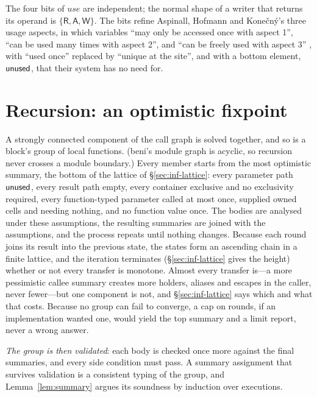 The four bits of $\mathit{use}$ are independent; the normal shape of a writer that returns its operand
is $\{\mathsf{R}, \mathsf{A}, \mathsf{W}\}$. The bits refine Aspinall, Hofmann and Kone\v{c}n\'y's three
usage aspects, in which variables ``may only be accessed once with aspect 1'', ``can be used many times
with aspect 2'', and ``can be freely used with aspect 3'' \citep[\S1]{aspinall2008usage}, with ``used
once'' replaced by ``unique at the site'', and with a bottom element, $\mathsf{unused}$, that their system has
no need for.

\section{Recursion: an optimistic fixpoint}
\label{sec:inf-recursion}

A strongly connected component of the call graph is solved together, and so is a block's group of local
functions. (beni's module graph is acyclic, so recursion never crosses a module boundary.) Every member
starts from the most optimistic summary, the bottom of the lattice of \S\ref{sec:inf-lattice}: every
parameter path $\mathsf{unused}$, every result path empty, every container exclusive and no exclusivity
required, every function-typed parameter called at most once, supplied owned cells and needing nothing,
and no function value once. The bodies are analysed under these assumptions, the resulting summaries
are joined with the assumptions, and the process repeats until nothing changes. Because each round joins
its result into the previous state, the states form an ascending chain in a finite lattice, and the
iteration terminates (\S\ref{sec:inf-lattice} gives the height) whether or not every transfer is
monotone. Almost every transfer is---a more pessimistic callee summary creates more holders, aliases and
escapes in the caller, never fewer---but one component is not, and \S\ref{sec:inf-lattice} says which and
what that costs. Because no group can fail to converge, a cap on rounds, if an implementation wanted one, would
yield the top summary and a limit report, never a wrong answer.

\emph{The group is then validated}: each body is checked once more against the final summaries, and
every side condition must pass. A summary assignment that survives validation is a consistent typing
of the group, and Lemma~\ref{lem:summary} argues its soundness by induction over executions.

